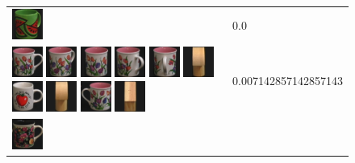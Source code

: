 \begin{figure}[tbp]
\begin{center}
\begin{tabular}{m{11cm} | m{3cm} |}
\includegraphics[width=1cm]{coil/beeld-33.eps}
& {\scriptsize 0.0}
\\
\includegraphics[width=1cm]{coil/beeld-6.eps}
\includegraphics[width=1cm]{coil/beeld-9.eps}
\includegraphics[width=1cm]{coil/beeld-8.eps}
\includegraphics[width=1cm]{coil/beeld-10.eps}
\includegraphics[width=1cm]{coil/beeld-11.eps}
\includegraphics[width=1cm]{coil/beeld-2.eps}
\includegraphics[width=1cm]{coil/beeld-36.eps}
\includegraphics[width=1cm]{coil/beeld-5.eps}
\includegraphics[width=1cm]{coil/beeld-7.eps}
\includegraphics[width=1cm]{coil/beeld-47.eps}
& {\scriptsize 0.007142857142857143}
\\
\includegraphics[width=1cm]{coil/beeld-60.eps}

\end{tabular}
\end{center}
\end{figure}
